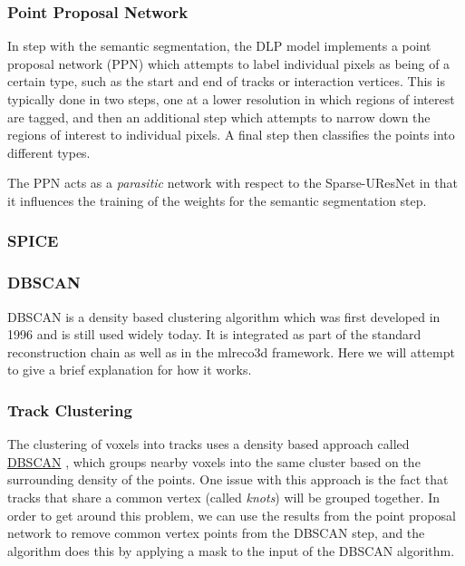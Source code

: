 \documentclass[8pt]{refart}
\begin{document}
\subsubsection{Point Proposal Network}\label{pointproposalnetwork} In step with the semantic segmentation, the DLP model implements a point proposal network (PPN) \cite{DLP1} which attempts to label individual pixels as being of a certain type, such as the start and end of tracks or interaction vertices.  This is typically done in two steps, one at a lower resolution in which regions of interest are tagged, and then an additional step which attempts to narrow down the regions of interest to individual pixels.  A final step then classifies the points into different types.  

The PPN acts as a \textit{parasitic} network with respect to the Sparse-UResNet in that it influences the training of the weights for the semantic segmentation step.  

\subsubsection{SPICE}\label{SPICE}

\subsubsection{DBSCAN}\label{dbscan}
DBSCAN is a density based clustering algorithm \cite{DBSCAN1,DBSCAN2} which was first developed in 1996 and is still used widely today.  It is integrated as part of the standard reconstruction chain as well as in the mlreco3d framework.  Here we will attempt to give a brief explanation for how it works.

\subsubsection{Track Clustering}\label{trackclustering}
The clustering of voxels into tracks uses a density based approach called \hyperref[dbscan]{DBSCAN} \cite{DBSCAN1, DBSCAN2}, which groups nearby voxels into the same cluster based on the surrounding density of the points.  One issue with this approach is the fact that tracks that share a common vertex (called \textit{knots}) will be grouped together.  In order to get around this problem, we can use the results from the point proposal network to remove common vertex points from the DBSCAN step, and the algorithm does this by applying a mask to the input of the DBSCAN algorithm.
\end{document}
